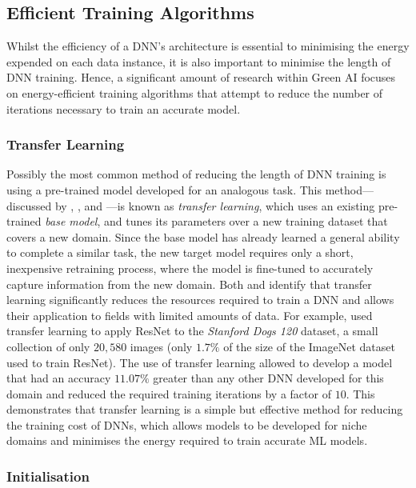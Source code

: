 \documentclass[a4paper, 11pt]{report}
\begin{document}
    \subsection{Efficient Training Algorithms}
    \label{section: efficient-training}

    Whilst the efficiency of a DNN's architecture is essential to minimising the energy expended on each data instance, it is also important to minimise the length of DNN training. Hence, a significant amount of research within Green AI focuses on energy-efficient training algorithms that attempt to reduce the number of iterations necessary to train an accurate model.


    \subsubsection{Transfer Learning}

    Possibly the most common method of reducing the length of DNN training is using a pre-trained model developed for an analogous task. This method---discussed by \citet{strubell-2019}, \citet{walsh-2021}, and \citet{schwartz-2019}---is known as \emph{transfer learning}, which uses an existing pre-trained \emph{base model}, and tunes its parameters over a new training dataset that covers a new domain. Since the base model has already learned a general ability to complete a similar task, the new target model requires only a short, inexpensive retraining process, where the model is fine-tuned to accurately capture information from the new domain. Both \citet{strubell-2019} and \citet{walsh-2021} identify that transfer learning significantly reduces the resources required to train a DNN and allows their application to fields with limited amounts of data. For example, \citet{wang-2020} used transfer learning to apply ResNet to the \emph{Stanford Dogs 120} dataset, a small collection of only $20,580$ images (only $1.7\%$ of the size of the ImageNet dataset used to train ResNet). The use of transfer learning allowed \citet{wang-2020} to develop a model that had an accuracy $11.07\%$ greater than any other DNN developed for this domain and reduced the required training iterations by a factor of $10$. This demonstrates that transfer learning is a simple but effective method for reducing the training cost of DNNs, which allows models to be developed for niche domains and minimises the energy required to train accurate ML models.


    \subsubsection{Initialisation}
\end{document}

